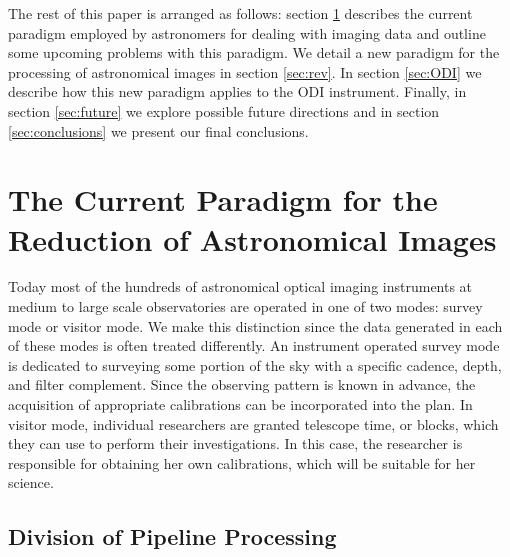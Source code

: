 \documentclass[10pt,conference]{IEEEtran}
\begin{document}
The rest of this paper is arranged as follows: section \ref{sec:current} describes the current paradigm employed by astronomers for dealing with imaging data and outline some upcoming problems with this paradigm. We detail a new paradigm for the processing of astronomical images in section \ref{sec:rev}. In section \ref{sec:ODI} we describe how this new paradigm applies to the ODI instrument. Finally, in section \ref{sec:future} we explore possible future directions and in section \ref{sec:conclusions} we present our final conclusions.

\section{The Current Paradigm for the Reduction of Astronomical Images}\label{sec:current}

Today most of the hundreds of astronomical optical imaging instruments at medium to large scale observatories are operated in one of two modes: survey mode or visitor mode. We make this distinction since the data generated in each of these modes is often treated differently. An instrument operated survey mode is dedicated to surveying some portion of the sky with a specific cadence, depth, and filter complement. Since the observing pattern is known in advance, the acquisition of appropriate calibrations can be incorporated into the plan. In visitor mode, individual researchers are granted telescope time, or blocks, which they can use to perform their investigations. In this case, the researcher is responsible for obtaining her own calibrations, which will be suitable for her science. 

\subsection{Division of Pipeline Processing}\label{sec:tiers}
\end{document}
